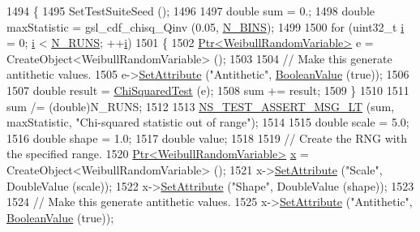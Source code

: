 \begin{DoxyCode}
1494 \{
1495   SetTestSuiteSeed ();
1496 
1497   \textcolor{keywordtype}{double} sum = 0.;
1498   \textcolor{keywordtype}{double} maxStatistic = gsl\_cdf\_chisq\_Qinv (0.05, \hyperlink{classRandomVariableStreamWeibullAntitheticTestCase_a2baff2d33d1b05454d39faffabc608e7}{N\_BINS});
1499 
1500   \textcolor{keywordflow}{for} (uint32\_t \hyperlink{bernuolliDistribution_8m_a6f6ccfcf58b31cb6412107d9d5281426}{i} = 0; \hyperlink{bernuolliDistribution_8m_a6f6ccfcf58b31cb6412107d9d5281426}{i} < \hyperlink{classRandomVariableStreamWeibullAntitheticTestCase_ac17120f5eedf02035d6cf81715df2e77}{N\_RUNS}; ++\hyperlink{bernuolliDistribution_8m_a6f6ccfcf58b31cb6412107d9d5281426}{i})
1501     \{
1502       \hyperlink{classns3_1_1Ptr}{Ptr<WeibullRandomVariable>} e = CreateObject<WeibullRandomVariable> ();
1503 
1504       \textcolor{comment}{// Make this generate antithetic values.}
1505       e->\hyperlink{classns3_1_1ObjectBase_ac60245d3ea4123bbc9b1d391f1f6592f}{SetAttribute} (\textcolor{stringliteral}{"Antithetic"}, \hyperlink{classns3_1_1BooleanValue}{BooleanValue} (\textcolor{keyword}{true}));
1506 
1507       \textcolor{keywordtype}{double} result = \hyperlink{classRandomVariableStreamWeibullAntitheticTestCase_a11d8f1f30bde4065c9e4cb8178f4c8a1}{ChiSquaredTest} (e);
1508       sum += result;
1509     \}
1510 
1511   sum /= (double)N\_RUNS;
1512 
1513   \hyperlink{group__testing_ga1d96848b91407c9a0b36583e8b0ad7ae}{NS\_TEST\_ASSERT\_MSG\_LT} (sum, maxStatistic, \textcolor{stringliteral}{"Chi-squared statistic out of range"});
1514 
1515   \textcolor{keywordtype}{double} scale = 5.0;
1516   \textcolor{keywordtype}{double} shape = 1.0;
1517   \textcolor{keywordtype}{double} value;
1518 
1519   \textcolor{comment}{// Create the RNG with the specified range.}
1520   \hyperlink{classns3_1_1Ptr}{Ptr<WeibullRandomVariable>} \hyperlink{lte__link__budget__x2__handover__measures_8m_a9336ebf25087d91c818ee6e9ec29f8c1}{x} = CreateObject<WeibullRandomVariable> ();
1521   x->\hyperlink{classns3_1_1ObjectBase_ac60245d3ea4123bbc9b1d391f1f6592f}{SetAttribute} (\textcolor{stringliteral}{"Scale"}, DoubleValue (scale));
1522   x->\hyperlink{classns3_1_1ObjectBase_ac60245d3ea4123bbc9b1d391f1f6592f}{SetAttribute} (\textcolor{stringliteral}{"Shape"}, DoubleValue (shape));
1523 
1524   \textcolor{comment}{// Make this generate antithetic values.}
1525   x->\hyperlink{classns3_1_1ObjectBase_ac60245d3ea4123bbc9b1d391f1f6592f}{SetAttribute} (\textcolor{stringliteral}{"Antithetic"}, \hyperlink{classns3_1_1BooleanValue}{BooleanValue} (\textcolor{keyword}{true}));

\end{DoxyCode}
